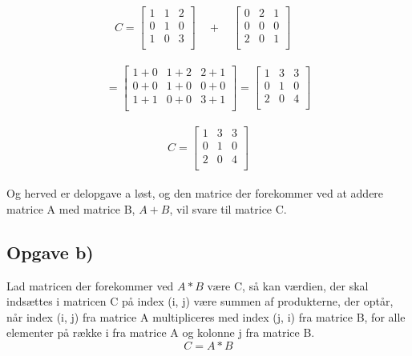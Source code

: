 \documentclass[20pt]{article}
\begin{document}
	\begin{equation}
			C = 
		\begin{bmatrix} 
			1 & 1 & 2 \\
			0 & 1 & 0 \\
			1 & 0 & 3 \\
		\end{bmatrix}
		\quad + \quad
		\begin{bmatrix} 
			0 & 2 & 1 \\
			0 & 0 & 0 \\
			2 & 0 & 1 \\
		\end{bmatrix}
		\quad	
	\end{equation}
	\\ 
	\begin{equation}
		= 
		\begin{bmatrix} 
			1+0 & 1+2 & 2+1 \\
			0+0 & 1+0 & 0+0 \\
			1+1 & 0+0 & 3+1 \\
		\end{bmatrix}
		= 
		\begin{bmatrix} 
			1 & 3 & 3 \\
			0 & 1 & 0 \\
			2 & 0 & 4 \\
		\end{bmatrix}
	\end{equation}
	\\
	\begin{equation}
		C = 
		\begin{bmatrix} 
			1 & 3 & 3 \\
			0 & 1 & 0 \\
			2 & 0 & 4 \\
		\end{bmatrix}
	\end{equation}
	\\
	Og herved er delopgave a løst, og den matrice der forekommer ved at addere matrice A med matrice B, \(A+B\), vil svare til matrice C.
	\newpage
	\subsection*{Opgave b)}
	Lad matricen der forekommer ved \(A*B\) være C, så kan værdien, der skal indsættes i matricen C på index (i, j) være summen af produkterne, der optår, når index (i, j) fra matrice A multipliceres med index (j, i) fra matrice B, for alle elementer på række i fra matrice A og kolonne j fra matrice B.
		\begin{equation}
		C = A*B
	\end{equation}
	
\end{document}
